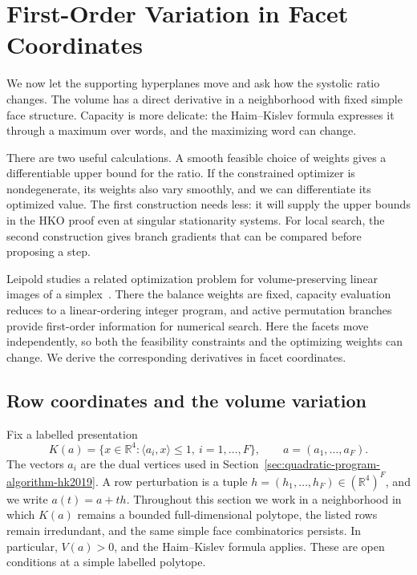\section{First-Order Variation in Facet Coordinates}
\label{sec:first-order-perturbations}

We now let the supporting hyperplanes move and ask how the systolic ratio
changes. The volume has a direct derivative in a neighborhood with fixed
simple face structure. Capacity is more delicate: the Haim--Kislev formula
expresses it through a maximum over words, and the maximizing word can change.

There are two useful calculations. A smooth feasible choice of weights
gives a differentiable upper bound for the ratio. If the constrained
optimizer is nondegenerate, its weights also vary smoothly, and we can
differentiate its optimized value. The first construction needs less:
it will supply the upper bounds in the HKO proof even at singular
stationarity systems. For local search, the second construction gives
branch gradients that can be compared before proposing a step.

Leipold studies a related optimization problem for volume-preserving linear
images of a simplex~\cite[Sections~9.2, 11.3, and~12.3]{Leipold2026}.
There the balance weights are fixed, capacity evaluation reduces to a
linear-ordering integer program, and active permutation branches provide
first-order information for numerical search. Here the facets move
independently, so both the feasibility constraints and the optimizing weights
can change. We derive the corresponding derivatives in facet coordinates.

\subsection{Row coordinates and the volume variation}
\label{subsec:first-order-row-chart}

Fix a labelled presentation
\begin{equation}\label{eq:first-order-row-chart}
  K(a)=\{x\in\mathbb R^4:
    \langle a_i,x\rangle\leq 1,\ i=1,\ldots,F\},
  \qquad
  a=(a_1,\ldots,a_F).
\end{equation}
The vectors \(a_i\) are the dual vertices used in
Section~\ref{sec:quadratic-program-algorithm-hk2019}.  A row perturbation is a
tuple \(h=(h_1,\ldots,h_F)\in(\mathbb R^4)^F\), and we write
\(a(t)=a+th\).  Throughout this section we work in a neighborhood in which
\(K(a)\) remains a bounded full-dimensional polytope, the listed rows remain
irredundant, and the same simple face combinatorics persists.  In particular,
\(V(a)>0\), and the Haim--Kislev formula applies.  These are open conditions at
a simple labelled polytope.

